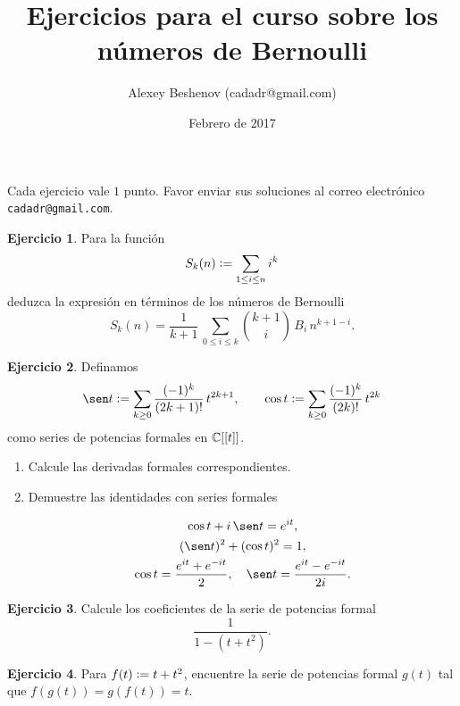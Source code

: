 \documentclass{article}
\author{Alexey Beshenov (cadadr@gmail.com)}
\title{Ejercicios para el curso sobre los números de Bernoulli}
\date{Febrero de 2017}
\theoremstyle{definition}
\newtheorem{ejerc}{Ejercicio}
\begin{document}
{\normalfont\sffamily\bfseries \maketitle}

Cada ejercicio vale $1$ punto. Favor enviar sus soluciones al correo electrónico \texttt{cadadr@gmail.com}.

\begin{ejerc}
Para la función
$$S_k (n) \mathrel{\mathop:}= \sum_{1 \le i \le n} i^k$$
deduzca la expresión en términos de los números de Bernoulli
$$S_k (n) = \frac{1}{k+1}\,\sum_{0 \le i \le k} {k+1\choose i}\,B_i\,n^{k+1-i}.$$
\end{ejerc}

\begin{ejerc}
Definamos
$$\sen t \dfn \sum_{k \ge 0} \frac{(-1)^k}{(2k+1)!}\,t^{2k+1}, \quad\quad \cos t \dfn \sum_{k \ge 0} \frac{(-1)^k}{(2k)!}\,t^{2k}$$
como series de potencias formales en $\mathbb{C} [[t]]$.

\begin{enumerate}
\item Calcule las derivadas formales correspondientes.

\item Demuestre las identidades con series formales

\begin{gather*}
\cos t + i\,\sen t = e^{it},\\
(\sen t)^2 + (\cos t)^2 = 1,\\
\cos t = \frac{e^{it} + e^{-it}}{2}, \quad \sen t = \frac{e^{it} - e^{-it}}{2i}.
\end{gather*}
\end{enumerate}
\end{ejerc}

\begin{ejerc}
Calcule los coeficientes de la serie de potencias formal
$$\frac{1}{1 - (t+t^2)}.$$
\end{ejerc}

\begin{ejerc}
Para $f (t) \mathrel{\mathop:}= t + t^2$, encuentre la serie de potencias formal $g (t)$ tal que $f (g (t)) = g (f (t)) = t$.
\end{ejerc}

\pagebreak
\end{document}

